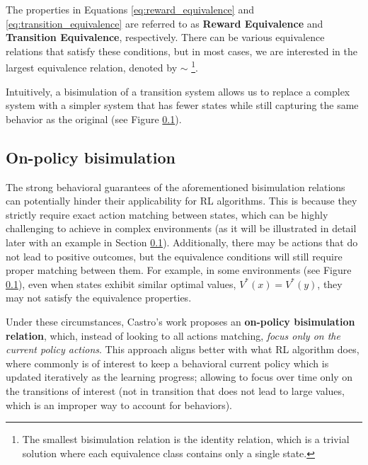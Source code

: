 The properties in Equations \ref{eq:reward_equivalence} and \ref{eq:transition_equivalence} are referred to as \textbf{Reward Equivalence} and \textbf{Transition Equivalence}, respectively. There can be various equivalence relations that satisfy these conditions, but in most cases, we are interested in the largest equivalence relation, denoted by $\sim$ \footnote{The smallest bisimulation relation is the identity relation, which is a trivial solution where each equivalence class contains only a single state.}.

Intuitively, a bisimulation of a transition system allows us to replace a complex system with a simpler system that has fewer states while still capturing the same behavior as the original (see Figure \ref{}).

\subsection{On-policy bisimulation}

The strong behavioral guarantees of the aforementioned bisimulation relations can potentially hinder their applicability for RL algorithms. This is because they strictly require exact action matching between states, which can be highly challenging to achieve in complex environments (as it will be illustrated in detail later with an example in Section \ref{}). Additionally, there may be actions that do not lead to positive outcomes, but the equivalence conditions will still require proper matching between them. For example, in some environments (see Figure \ref{}), even when states exhibit similar optimal values, $V^*(x) = V^*(y)$, they may not satisfy the equivalence properties.

Under these circumstances, Castro's work \cite{castro2020scalable} proposes an \textbf{on-policy bisimulation relation}, which, instead of looking to all actions matching, \textit{focus only on the current policy actions}. This approach aligns better with what RL algorithm does, where commonly is of interest to keep a behavioral current policy which is updated iteratively as the learning progress; allowing to focus over time only on the transitions of interest (not in transition that does not lead to large values, which is an improper way to account for behaviors).


